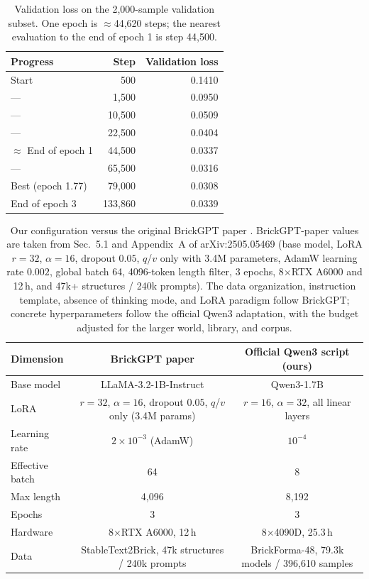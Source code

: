 \documentclass[letterpaper]{article} %
\begin{document}
\begin{table}[!htbp]
\centering
\small
\begin{tabular}{lrr}
\toprule
Progress & Step & Validation loss \\
\midrule
Start & 500 & 0.1410 \\
--- & 1,500 & 0.0950 \\
--- & 10,500 & 0.0509 \\
--- & 22,500 & 0.0404 \\
$\approx$ End of epoch 1 & 44,500 & 0.0337 \\
--- & 65,500 & 0.0316 \\
Best (epoch 1.77) & 79,000 & 0.0308 \\
End of epoch 3 & 133,860 & 0.0339 \\
\bottomrule
\end{tabular}
\caption{Validation loss on the 2,000-sample validation subset. One epoch is $\approx$44,620 steps; the nearest evaluation to the end of epoch 1 is step 44,500.}
\label{tab:eval-loss}
\end{table}

\begin{table}[!htbp]
\centering
\small
\setlength{\tabcolsep}{5pt}
\begin{tabular}{lcc}
\toprule
Dimension & BrickGPT paper & Official Qwen3 script (ours) \\
\midrule
Base model & LLaMA-3.2-1B-Instruct & Qwen3-1.7B \\
LoRA & $r=32$, $\alpha=16$, dropout $0.05$, $q$/$v$ only (3.4M params) & $r=16$, $\alpha=32$, all linear layers \\
Learning rate & $2{\times}10^{-3}$ (AdamW) & $10^{-4}$ \\
Effective batch & 64 & 8 \\
Max length & 4,096 & 8,192 \\
Epochs & 3 & 3 \\
Hardware & 8$\times$RTX A6000, 12\,h & 8$\times$4090D, 25.3\,h \\
Data & StableText2Brick, 47k structures / 240k prompts & BrickForma-48, 79.3k models / 396,610 samples \\
\bottomrule
\end{tabular}
\caption{Our configuration versus the original BrickGPT paper \cite{brickgpt}. BrickGPT-paper values are taken from Sec.~5.1 and Appendix~A of arXiv:2505.05469 (base model, LoRA $r{=}32$, $\alpha{=}16$, dropout $0.05$, $q$/$v$ only with 3.4M parameters, AdamW learning rate $0.002$, global batch 64, 4096-token length filter, 3 epochs, 8$\times$RTX A6000 and 12\,h, and 47k+ structures / 240k prompts). The data organization, instruction template, absence of thinking mode, and LoRA paradigm follow BrickGPT; concrete hyperparameters follow the official Qwen3 adaptation, with the budget adjusted for the larger world, library, and corpus.}
\label{tab:brickgpt-recipe}
\end{table}
\end{document}
